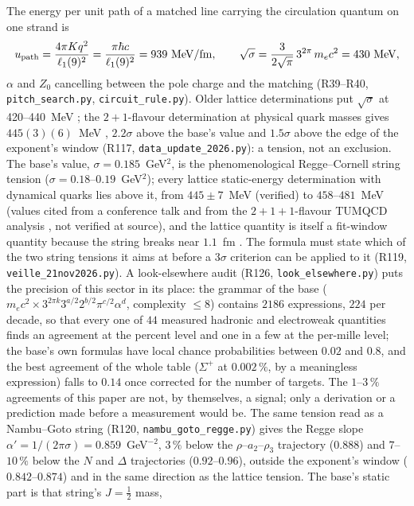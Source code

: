 \documentclass[11pt,a4paper]{article}
\theoremstyle{plain}
\theoremstyle{remark}
\newcommand{\lone}{\ensuremath{\ell_1}}
\begin{document}
The energy per unit path of a matched line carrying the circulation quantum on one strand is
\[
u_{\rm path} = \frac{4\pi K q^2}{\lone(9)^2} = \frac{\pi\hbar c}{\lone(9)^2} = 939\ {\rm MeV/fm},
\qquad
\sqrt\sigma = \frac{3}{2\sqrt\pi}\,3^{2\pi}\,m_e c^2 = 430\ {\rm MeV},
\]
$\alpha$ and $Z_0$ cancelling between the pole charge and the matching (R39--R40,
\texttt{pitch\_search.py}, \texttt{circuit\_rule.py}). Older lattice determinations put $\sqrt\sigma$ at
420--440~MeV \cite{necco}; the $2+1$-flavour determination at physical quark masses gives
$445(3)(6)$~MeV \cite{bulava}, $2.2\sigma$ above the base's value and $1.5\sigma$ above the edge of
the exponent's window (R117, \texttt{data\_update\_2026.py}): a tension, not an exclusion. The base's
value, $\sigma = 0.185$~GeV$^2$, is the phenomenological Regge--Cornell string tension ($\sigma = 0.18$--$0.19$~GeV$^2$);
every lattice static-energy determination with dynamical quarks lies above it, from $445 \pm 7$~MeV (verified)
to $458$--$481$~MeV (values cited from a conference talk and from the $2+1+1$-flavour TUMQCD analysis
\cite{tumqcd}, not verified at source), and the lattice quantity is itself a fit-window quantity because the
string breaks near $1.1$~fm \cite{cea}. The formula must state which of the two string tensions it aims at
before a $3\sigma$ criterion can be applied to it (R119, \texttt{veille\_21nov2026.py}). A look-elsewhere audit
(R126, \texttt{look\_elsewhere.py}) puts the precision of this sector in its place: the grammar of the base
($m_e c^2 \times 3^{2\pi k}3^{a/2}2^{b/2}\pi^{c/2}\alpha^d$, complexity $\le 8$) contains $2186$ expressions, $224$
per decade, so that every one of $44$ measured hadronic and electroweak quantities finds an agreement at the percent
level and one in a few at the per-mille level; the base's own formulas have local chance probabilities between
$0.02$ and $0.8$, and the best agreement of the whole table ($\Sigma^+$ at $0.002\,\%$, by a meaningless expression)
falls to $0.14$ once corrected for the number of targets. The $1$--$3\,\%$ agreements of this paper are not, by
themselves, a signal; only a derivation or a prediction made before a measurement would be. The same tension read as a
Nambu--Goto string (R120, \texttt{nambu\_goto\_regge.py}) gives the Regge slope $\alpha' = 1/(2\pi\sigma) =
0.859$~GeV$^{-2}$, $3\,\%$ below the $\rho$--$a_2$--$\rho_3$ trajectory ($0.888$) and $7$--$10\,\%$ below the $N$
and $\Delta$ trajectories ($0.92$--$0.96$), outside the exponent's window ($0.842$--$0.874$) and in the same
direction as the lattice tension. The base's static part is that string's $J = \tfrac12$ mass,
\end{document}
